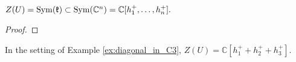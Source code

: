 \begin{proposition}\label{prop:center_of_HEA}
$Z(U)={\rm Sym }(\mathfrak{k})\subset {\rm Sym }(\mathbb{C}^n)=\mathbb{C}[h_1^+,\dots,h_n^+].$
\end{proposition}
\begin{proof}

\end{proof}

\begin{example}
In the setting of Example \ref{ex:diagonal_in_C3}, $Z(U)=\mathbb{C}[h_1^++h_2^++h_3^+]$.
\end{example}

